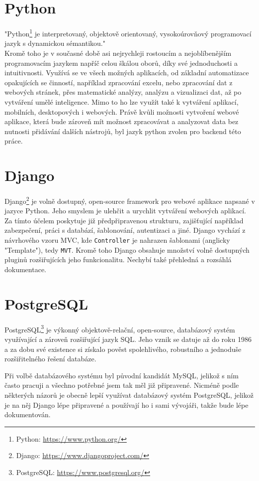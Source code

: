 \section{Python}
"Python\footnote{Python: \url{https://www.python.org/}} je interpretovaný, objektově orientovaný, vysokoúrovňový programovací jazyk s dynamickou sémantikou." \cite{PYTHON} \\
Kromě toho je v současné době asi nejrychleji rostoucím a nejoblíbenějším programovacím jazykem napříč celou škálou oborů, díky své jednoduchosti a intuitivnosti. Využívá se ve všech možných aplikacích, od základní automatizace opakujících se činností, například zpracování excelu, nebo zpracování dat z webových stránek, přes matematické analýzy, analýzu a vizualizaci dat, až po vytváření umělé inteligence. Mimo to ho lze využít také k vytváření aplikací, mobilních, desktopových i webových. Právě kvůli možnosti vytvoření webové aplikace, která bude zároveň mít možnost zpracovávat a analyzovat data bez nutnosti přidávání dalších nástrojů, byl jazyk python zvolen pro backend této práce.

\section{Django}
Django\footnote{Django: \url{https://www.djangoproject.com/}} je volně dostupný, open-source framework pro webové aplikace napsané v jazyce Python. Jeho smyslem je ulehčit a urychlit vytváření webových aplikací. Za tímto účelem poskytuje již předpřipravenou strukturu, zajišťující například zabezpečení, práci s databází, šablonování, autentizaci a jiné. Django vychází z návrhového vzoru MVC, kde \texttt{Controller} je nahrazen šablonami (anglicky "Template"), tedy \texttt{MVT}. Kromě toho Django obsahuje množství volně dostupných pluginů rozšiřujících jeho funkcionalitu. Nechybí také přehledná a rozsáhlá dokumentace.


\section{PostgreSQL}
PostgreSQL\footnote{PostgreSQL: \url{https://www.postgresql.org/}} je výkonný objektově-relační, open-source, databázový systém využívající a zároveň rozšiřující jazyk SQL. Jeho vznik se datuje až do roku 1986 a za dobu své existence si získalo pověst spolehlivého, robustního a jednoduše rozšiřitelného řešení databáze. \cite{PostgreSQL}
\par Při volbě databázového systému byl původní kandidát MySQL, jelikož s ním často pracuji a všechno potřebné jsem tak měl již připravené. Nicméně podle některých názorů \cite{WHY-POSTGRES1}\cite{WHY-POSTGRES2} je obecně lepší využívat databázový systém PostgreSQL, jelikož je na něj Django lépe připravené a používají ho i sami vývojáři, takže bude lépe dokumentován.



